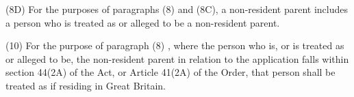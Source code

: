 \documentclass[12pt,a4paper]{article}
\begin{document}
(8D) For the purposes of paragraphs (8) and (8C), a non-resident parent includes a 
person who is treated as or alleged to be a non-resident parent.


(10) For the purpose of 
paragraph  %
(8)%
, where the person who is, or is treated as or alleged to be, the non-resident parent in relation to the application falls within section 44(2A) of the Act, or Article 41(2A) of the Order, that person shall be treated as if residing in Great Britain.
\end{document}
